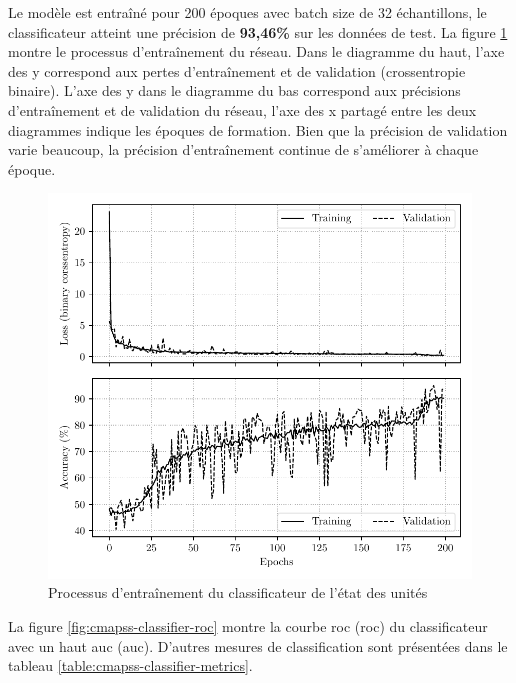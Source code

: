 Le modèle est entraîné pour 200 époques avec batch size de 32 échantillons, le classificateur atteint une précision de \textbf{93,46\%} sur les données de test. La figure \ref{fig:cmapss-classifier-training} montre le processus d'entraînement du réseau. Dans le diagramme du haut, l'axe des y correspond aux pertes d'entraînement et de validation (crossentropie binaire). L'axe des y dans le diagramme du bas correspond aux précisions d'entraînement et de validation du réseau, l'axe des x partagé entre les deux diagrammes indique les époques de formation. Bien que la précision de validation varie beaucoup, la précision d'entraînement continue de s'améliorer à chaque époque.

\begin{figure}[H]
    \centering
    \includegraphics{figures/cmapss_classification_training.pdf}
    \caption{Processus d'entraînement du classificateur de l'état des unités}
    \label{fig:cmapss-classifier-training}
\end{figure}

La figure \ref{fig:cmapss-classifier-roc} montre la courbe \acrlong{roc} (\acrshort{roc}) du classificateur avec un haut \acrlong{auc} (\acrshort{auc}). D'autres mesures de classification sont présentées dans le tableau \ref{table:cmapss-classifier-metrics}.

